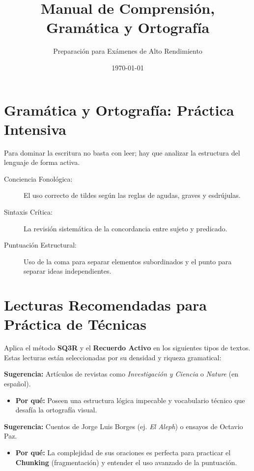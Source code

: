\documentclass[12pt,a4paper]{article}
\title{\textbf{Manual de Comprensión, Gramática y Ortografía}}
\author{Preparación para Exámenes de Alto Rendimiento}
\date{\today}
\begin{document}
\maketitle

\section{Gramática y Ortografía: Práctica Intensiva}

Para dominar la escritura no basta con leer; hay que analizar la estructura del lenguaje de forma activa.

\begin{description}
    \item[Conciencia Fonológica:] El uso correcto de tildes según las reglas de agudas, graves y esdrújulas.
    \item[Sintaxis Crítica:] La revisión sistemática de la concordancia entre sujeto y predicado.
    \item[Puntuación Estructural:] Uso de la coma para separar elementos subordinados y el punto para separar ideas independientes.
\end{description}

\section{Lecturas Recomendadas para Práctica de Técnicas}

Aplica el método \textbf{SQ3R} y el \textbf{Recuerdo Activo} en los siguientes tipos de textos. Estas lecturas están seleccionadas por su densidad y riqueza gramatical:

\begin{tcolorbox}[colframe=blue!50!black, colback=white, title=1. Ensayos Científicos y Divulgación]
    \textbf{Sugerencia:} Artículos de revistas como \textit{Investigación y Ciencia} o \textit{Nature} (en español).
    \begin{itemize}
        \item \textbf{Por qué:} Poseen una estructura lógica impecable y vocabulario técnico que desafía la ortografía visual.
    \end{itemize}
\end{tcolorbox}

\begin{tcolorbox}[colframe=green!50!black, colback=white, title=2. Literatura Clásica (Análisis de Sintaxis)]
    \textbf{Sugerencia:} Cuentos de Jorge Luis Borges (ej. \textit{El Aleph}) o ensayos de Octavio Paz.
    \begin{itemize}
        \item \textbf{Por qué:} La complejidad de sus oraciones es perfecta para practicar el \textbf{Chunking} (fragmentación) y entender el uso avanzado de la puntuación.
    \end{itemize}
\end{tcolorbox}
\end{document}
